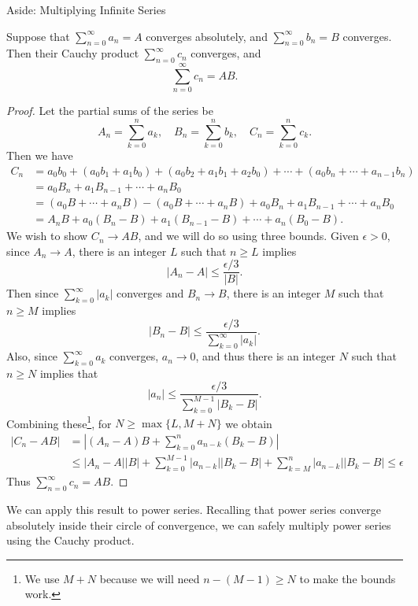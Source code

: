 \documentclass[a4paper]{scrartcl}
\begin{document}
\begin{aside}{Aside: Multiplying Infinite Series}
\begin{theorem*}
	Suppose that $\sum_{n = 0}^{\infty} a_n = A$ converges absolutely, and $\sum_{n = 0}^{\infty} b_n = B$ converges. Then their Cauchy product $\sum_{n = 0}^{\infty} c_n$ converges, and 
	$$
	\sum_{n = 0}^{\infty} c_n = AB.
	$$
\end{theorem*}
\begin{proof}
	Let the partial sums of the series be
	$$
	A_n = \sum_{k = 0}^{n} a_k, \quad B_n = \sum_{k = 0}^{n} b_k, \quad C_n = \sum_{k = 0}^{n} c_k.
	$$
	Then we have
	\begin{align*}
		C_n &= a_0 b_0 + (a_0 b_1 + a_1 b_0) + (a_0 b_2 + a_1 b_1 + a_2 b_0) + \cdots + (a_0 b_n + \cdots + a_{n - 1} b_n) \\
		&= a_0 B_n + a_1 B_{n - 1} + \cdots + a_n B_0 \\
		&= (a_0 B + \cdots + a_n B) - (a_0 B + \cdots + a_n B) + a_0 B_n + a_1 B_{n - 1} + \cdots + a_n B_0 \\
		&= A_n B + a_0 (B_n - B) + a_1 (B_{n-1} - B) + \cdots + a_n(B_0 - B).
	\end{align*}
	We wish to show $C_n \rightarrow AB$, and we will do so using three bounds. Given $\epsilon > 0$, since $A_n \rightarrow A$, there is an integer $L$ such that $n \geq L$ implies
	$$
	|A_n - A| \leq \frac{\epsilon /3}{|B|}.
	$$
	Then since $\sum_{k = 0}^{\infty} |a_k|$ converges and $B_n \rightarrow B$, there is an integer $M$ such that $n \geq M$ implies
	$$
	|B_n - B| \leq \frac{\epsilon/3}{\sum_{k = 0}^{\infty} |a_k|}.
	$$
	Also, since $\sum_{k = 0}^{\infty} a_k$ converges, $a_n \rightarrow 0$, and thus there is an integer $N$ such that $n \geq N$ implies that
	$$
	|a_n| \leq \frac{\epsilon/3}{\sum_{k = 0}^{M-1} |B_k - B|}.
	$$
	Combining these\footnote{We use $M + N$ because we will need $n - (M - 1) \geq N$ to make the bounds work.}, for $N \geq \max\{L, M + N\}$ we obtain
	\begin{align*}
		|C_n - AB| &= \left|(A_n - A)B + \sum_{k = 0}^n a_{n - k} (B_k - B)\right| \\
		&\leq |A_n - A||B| + \sum_{k = 0}^{M - 1}|a_{n - k}| |B_k - B| + \sum_{k = M}^{n} |a_{n -k}| |B_{k} - B| \leq \epsilon
	\end{align*}
	Thus $\sum_{n = 0}^{\infty} c_n = AB$. \qedhere
\end{proof}

We can apply this result to power series. Recalling that power series converge absolutely inside their circle of convergence, we can safely multiply power series using the Cauchy product.


\end{aside}
\end{document}
